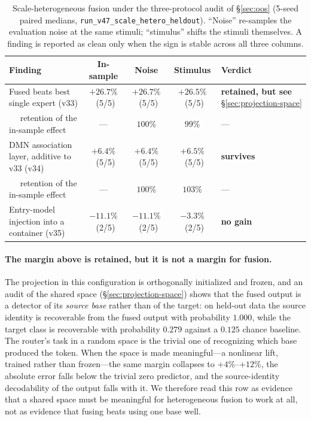 \documentclass[10pt]{article}
\theoremstyle{definition}
\theoremstyle{plain}
\theoremstyle{remark}
\begin{document}
\begin{table}[htbp]
\centering
\caption{Scale-heterogeneous fusion under the three-protocol audit of \S\ref{sec:oos} (5-seed paired
medians, \texttt{run\_v47\_scale\_hetero\_heldout}). ``Noise'' re-samples the evaluation noise at the
same stimuli; ``stimulus'' shifts the stimuli themselves. A finding is reported as clean only when the
sign is stable across all three columns.}
\label{tab:scale-hetero}
\small
\setlength{\tabcolsep}{4.5pt}
\begin{tabular}{p{}ccc p{}}
\toprule
\textbf{Finding} & \textbf{In-sample} & \textbf{Noise} & \textbf{Stimulus} & \textbf{Verdict} \\
\midrule
Fused beats best single expert (v33) & $+26.7\%$ \ (5/5) & $+26.7\%$ \ (5/5) & $+26.5\%$ \ (5/5) & \textbf{retained, but see} \S\ref{sec:projection-space} \\
$\quad$ retention of the in-sample effect & --- & $100\%$ & $99\%$ & --- \\
DMN association layer, additive to v33 (v34) & $+6.4\%$ \ (5/5) & $+6.4\%$ \ (5/5) & $+6.5\%$ \ (5/5) & \textbf{survives} \\
$\quad$ retention of the in-sample effect & --- & $100\%$ & $103\%$ & --- \\
Entry-model injection into a container (v35) & $-11.1\%$ \ (2/5) & $-11.1\%$ \ (2/5) & $-3.3\%$ \ (2/5) & \textbf{no gain} \\
\bottomrule
\end{tabular}
\end{table}

\paragraph{The margin above is retained, but it is not a margin for fusion.} The projection in this configuration is orthogonally initialized and frozen, and an audit of the shared space (\S\ref{sec:projection-space}) shows that the fused output is a detector of its \emph{source base} rather than of the target: on held-out data the source identity is recoverable from the fused output with probability $1.000$, while the target class is recoverable with probability $0.279$ against a $0.125$ chance baseline. The router's task in a random space is the trivial one of recognizing which base produced the token. When the space is made meaningful---a nonlinear lift, trained rather than frozen---the same margin collapses to $+4\%$--$+12\%$, the absolute error falls below the trivial zero predictor, and the source-identity decodability of the output falls with it. We therefore read this row as evidence that a shared space must be meaningful for heterogeneous fusion to work at all, not as evidence that fusing beats using one base well.
\end{document}
